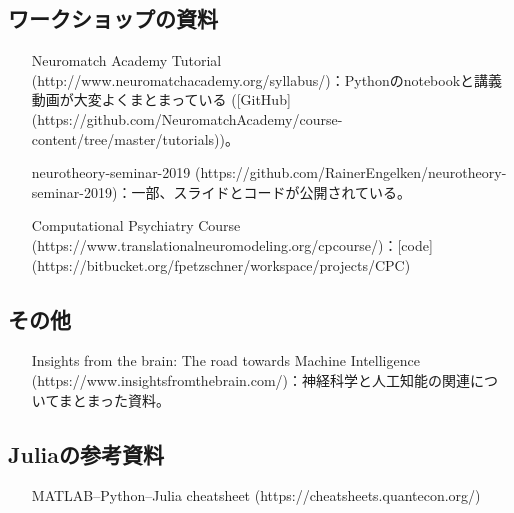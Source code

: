 \subsection{ワークショップの資料
}
\begin{itemize}
\item [Neuromatch Academy Tutorial](http://www.neuromatchacademy.org/syllabus/)：Pythonのnotebookと講義動画が大変よくまとまっている ([GitHub](https://github.com/NeuromatchAcademy/course-content/tree/master/tutorials))。
\item [neurotheory-seminar-2019](https://github.com/RainerEngelken/neurotheory-seminar-2019)：一部、スライドとコードが公開されている。
\item [Computational Psychiatry Course](https://www.translationalneuromodeling.org/cpcourse/)：[code](https://bitbucket.org/fpetzschner/workspace/projects/CPC)
\end{itemize}
\subsection{その他
}
\begin{itemize}
\item [Insights from the brain: The road towards Machine Intelligence](https://www.insightsfromthebrain.com/)：神経科学と人工知能の関連についてまとまった資料。
\end{itemize}
\subsection{Juliaの参考資料
}
\begin{itemize}
\item [MATLAB–Python–Julia cheatsheet](https://cheatsheets.quantecon.org/)
\end{itemize}
